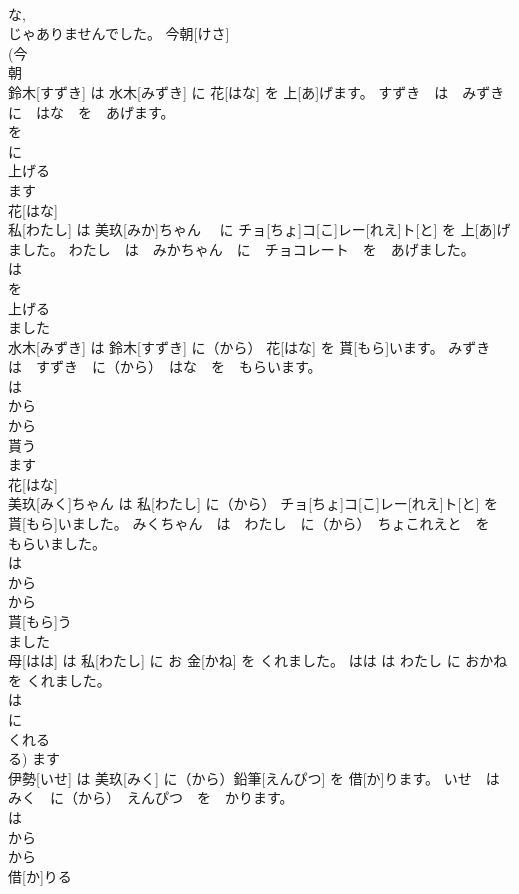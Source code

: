 \documentclass[8pt]{extreport}
\begin{document}
\begin{CJK}{UTF8}{min}
\\	な, 
\\	じゃありませんでした。	今朝[けさ] 
\\	(今 
\\	朝 
\\	鈴木[すずき] は 水木[みずき] に 花[はな] を 上[あ]げます。	すずき　は　みずき　に　はな　を　あげます。	
\\	を 
\\	に 
\\	上げる 
\\	ます 
\\	花[はな] 
\\	私[わたし] は 美玖[みか]ちゃん　 に チョ[ちょ]コ[こ]レー[れえ]ト[と] を 上[あ]げました。	わたし　は　みかちゃん　に　チョコレート　を　あげました。	
\\	は 
\\	を 
\\	上げる 
\\	ました 
\\	水木[みずき] は 鈴木[すずき] に（から） 花[はな] を 貰[もら]います。	みずき　は　すずき　に（から）　はな　を　もらいます。	
\\	は 
\\	から 
\\	から 
\\	貰う 
\\	ます 
\\	花[はな] 
\\	美玖[みく]ちゃん は 私[わたし] に（から） チョ[ちょ]コ[こ]レー[れえ]ト[と] を 貰[もら]いました。	みくちゃん　は　わたし　に（から）　ちょこれえと　を　もらいました。	
\\	は 
\\	から 
\\	から 
\\	貰[もら]う 
\\	ました 
\\	母[はは] は 私[わたし] に お 金[かね] を くれました。	はは は わたし に おかね を くれました。	
\\	は 
\\	に 
\\	くれる 
\\	る)	ます 
\\	伊勢[いせ] は 美玖[みく] に（から）鉛筆[えんぴつ] を 借[か]ります。	いせ　は　みく　に（から）　えんぴつ　を　かります。	
\\	は 
\\	から 
\\	から 
\\	借[か]りる 

\end{CJK}
\end{document}
